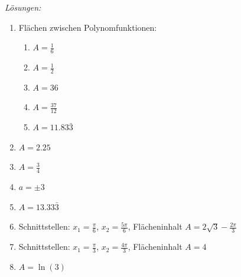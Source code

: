 \clearpage

\emph{Lösungen:}
\begin{enumerate}
	\item Flächen zwischen Polynomfunktionen:
	      \begin{enumerate}
		      \item \(A=\frac{1}{6}\)
		      \item \(A=\frac{1}{2}\)
		      \item \(A= 36\)
		      \item \(A= \frac{37}{12}\)
		      \item \(A=11.83\bar{3}\)
	      \end{enumerate}
	\item \(A=2.25\)
	\item \(A=\frac{3}{4}\)
	\item \(a=\pm3\)
	\item \(A=13.33\bar{3}\)
	\item Schnittstellen: \(x_1= \frac{\pi}{6}\), \(x_2= \frac{5\pi}{6}\), Flächeninhalt \(A=2\sqrt{3}-\frac{2\pi}{3}\)
	\item Schnittstellen: \(x_1= \frac{\pi}{3}\), \(x_2= \frac{4\pi}{3}\), Flächeninhalt \(A=4\)
	\item \(A= \ln(3)\)
\end{enumerate}









































\clearpage
